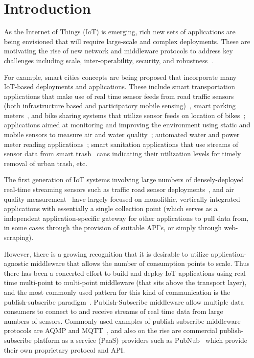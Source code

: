\section{Introduction}
\label{sec:intro}

As the Internet of Things (IoT) is emerging, rich new sets of applications are being envisioned that will require large-scale and complex deployments. These are motivating the rise of new network and middleware protocols to address 
key challenges including scale, inter-operability, security, and robustness~\cite{Stankovic14, al2015internet, sicari2015security}. 

For example, smart cities concepts are being proposed that incorporate many IoT-based deployments and applications. These include smart transportation applications that make use of real time sensor feeds from road traffic sensors (both infrastructure based and participatory mobile sensing)~\cite{leduc2008road, mohan2008nericell}, smart parking meters~\cite{ji2014cloud}, and bike sharing systems that utilize sensor feeds on location of bikes~\cite{midgley2009role}; applications aimed at monitoring and improving the environment using static and mobile sensors to measure air and water quality~\cite{dutta2009common, le2007design}; automated water and power meter reading applications~\cite{khalifa2011survey}; smart sanitation applications that use streams of sensor data from smart trash~\cite{glouche2013smart} cans indicating their utilization levels for timely removal of urban trash, etc. 

The first generation of IoT systems involving large numbers of densely-deployed real-time streaming sensors such as traffic road sensor deployments~\cite{pems17}, and air quality measurement~\cite{aqmd17} have largely focused on monolithic, vertically integrated applications with essentially a single collection point (which serves as a independent application-specific gateway for other applications to pull data from, in some cases through the provision of suitable API's, or simply through web-scraping). 

However, there is a growing recognition that it is desirable to utilize application-agnostic middleware that allows the number of consumption points to scale. Thus there has been a concerted effort to build and deploy IoT applications using real-time multi-point to multi-point middleware (that sits above the transport layer), and the most commonly used pattern for this kind of communication is the publish-subscribe paradigm~\cite{pubsub}. Publish-Subscribe middleware allow multiple data consumers to connect to and receive streams of real time data from large numbers of sensors. Commonly used examples of publish-subscribe middleware protocols are AQMP and MQTT~\cite{mqtt}, and also on the rise are commercial publish-subscribe platform as a service (PaaS) providers such as PubNub~\cite{pubnub} which provide their own proprietary protocol and API.  

